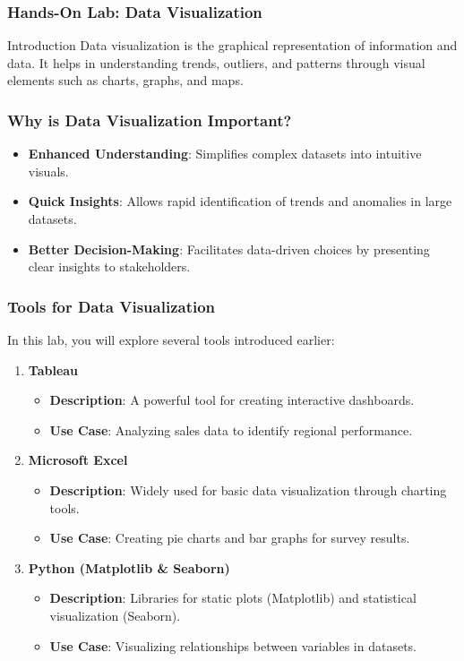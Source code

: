 \documentclass[aspectratio=169]{beamer}
\begin{document}
\begin{frame}
    \frametitle{Hands-On Lab: Data Visualization}
    \begin{block}{Introduction}
        Data visualization is the graphical representation of information and data. It helps in understanding trends, outliers, and patterns through visual elements such as charts, graphs, and maps.
    \end{block}
\end{frame}

\begin{frame}
    \frametitle{Why is Data Visualization Important?}
    \begin{itemize}
        \item \textbf{Enhanced Understanding}: Simplifies complex datasets into intuitive visuals.
        \item \textbf{Quick Insights}: Allows rapid identification of trends and anomalies in large datasets.
        \item \textbf{Better Decision-Making}: Facilitates data-driven choices by presenting clear insights to stakeholders.
    \end{itemize}
\end{frame}

\begin{frame}
    \frametitle{Tools for Data Visualization}
    In this lab, you will explore several tools introduced earlier:
    \begin{enumerate}
        \item \textbf{Tableau}
            \begin{itemize}
                \item \textbf{Description}: A powerful tool for creating interactive dashboards.
                \item \textbf{Use Case}: Analyzing sales data to identify regional performance.
            \end{itemize}
        \item \textbf{Microsoft Excel}
            \begin{itemize}
                \item \textbf{Description}: Widely used for basic data visualization through charting tools.
                \item \textbf{Use Case}: Creating pie charts and bar graphs for survey results.
            \end{itemize}
        \item \textbf{Python (Matplotlib \& Seaborn)}
            \begin{itemize}
                \item \textbf{Description}: Libraries for static plots (Matplotlib) and statistical visualization (Seaborn).
                \item \textbf{Use Case}: Visualizing relationships between variables in datasets.
            \end{itemize}
    \end{enumerate}
\end{frame}
\end{document}
